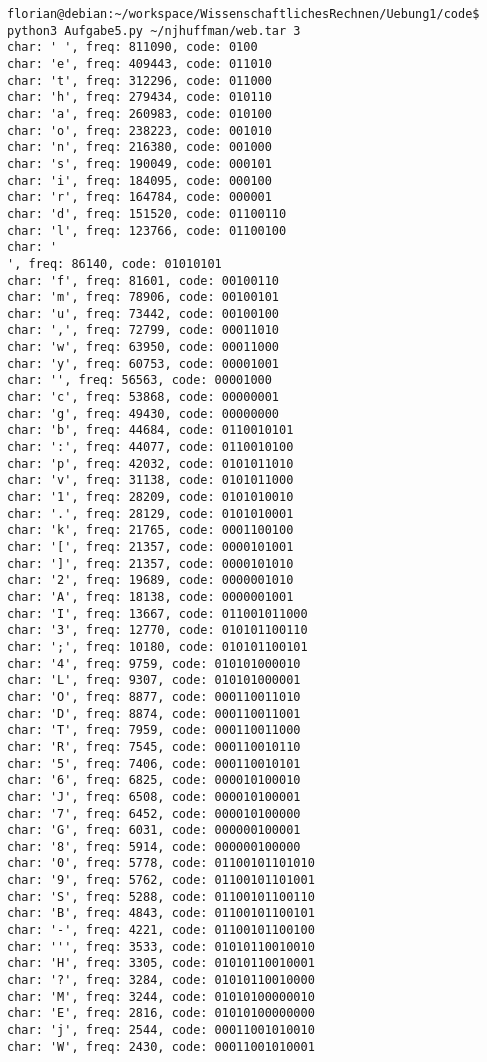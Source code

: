 \documentclass[11pt]{article} %
\theoremstyle{definition}
\begin{document}
\begin{enumerate}[(1)]
\begin{verbatim}
florian@debian:~/workspace/WissenschaftlichesRechnen/Uebung1/code$ python3 Aufgabe5.py ~/njhuffman/web.tar 3
char: ' ', freq: 811090, code: 0100
char: 'e', freq: 409443, code: 011010
char: 't', freq: 312296, code: 011000
char: 'h', freq: 279434, code: 010110
char: 'a', freq: 260983, code: 010100
char: 'o', freq: 238223, code: 001010
char: 'n', freq: 216380, code: 001000
char: 's', freq: 190049, code: 000101
char: 'i', freq: 184095, code: 000100
char: 'r', freq: 164784, code: 000001
char: 'd', freq: 151520, code: 01100110
char: 'l', freq: 123766, code: 01100100
char: '
', freq: 86140, code: 01010101
char: 'f', freq: 81601, code: 00100110
char: 'm', freq: 78906, code: 00100101
char: 'u', freq: 73442, code: 00100100
char: ',', freq: 72799, code: 00011010
char: 'w', freq: 63950, code: 00011000
char: 'y', freq: 60753, code: 00001001
char: '', freq: 56563, code: 00001000
char: 'c', freq: 53868, code: 00000001
char: 'g', freq: 49430, code: 00000000
char: 'b', freq: 44684, code: 0110010101
char: ':', freq: 44077, code: 0110010100
char: 'p', freq: 42032, code: 0101011010
char: 'v', freq: 31138, code: 0101011000
char: '1', freq: 28209, code: 0101010010
char: '.', freq: 28129, code: 0101010001
char: 'k', freq: 21765, code: 0001100100
char: '[', freq: 21357, code: 0000101001
char: ']', freq: 21357, code: 0000101010
char: '2', freq: 19689, code: 0000001010
char: 'A', freq: 18138, code: 0000001001
char: 'I', freq: 13667, code: 011001011000
char: '3', freq: 12770, code: 010101100110
char: ';', freq: 10180, code: 010101100101
char: '4', freq: 9759, code: 010101000010
char: 'L', freq: 9307, code: 010101000001
char: 'O', freq: 8877, code: 000110011010
char: 'D', freq: 8874, code: 000110011001
char: 'T', freq: 7959, code: 000110011000
char: 'R', freq: 7545, code: 000110010110
char: '5', freq: 7406, code: 000110010101
char: '6', freq: 6825, code: 000010100010
char: 'J', freq: 6508, code: 000010100001
char: '7', freq: 6452, code: 000010100000
char: 'G', freq: 6031, code: 000000100001
char: '8', freq: 5914, code: 000000100000
char: '0', freq: 5778, code: 01100101101010
char: '9', freq: 5762, code: 01100101101001
char: 'S', freq: 5288, code: 01100101100110
char: 'B', freq: 4843, code: 01100101100101
char: '-', freq: 4221, code: 01100101100100
char: ''', freq: 3533, code: 01010110010010
char: 'H', freq: 3305, code: 01010110010001
char: '?', freq: 3284, code: 01010110010000
char: 'M', freq: 3244, code: 01010100000010
char: 'E', freq: 2816, code: 01010100000000
char: 'j', freq: 2544, code: 00011001010010
char: 'W', freq: 2430, code: 00011001010001

\end{verbatim}
\end{enumerate}
\end{document}
